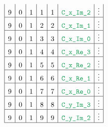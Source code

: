 \begin{figure}[h!]
\begin{adjustwidth}{-2cm}{-2cm}
{\[\begin{array}{|c|c|c|c|c|c|c|}
                    9                      & 0                                       & 1                                         & 1                      & 1                   & \locCXImTwo   & \vdots                                                               \\ \hline
                    9                      & 0                                       & 1                                         & 2                      & 2                   & \locCXImOne   & \vdots                                                               \\ \hline
                    9                      & 0                                       & 1                                         & 3                      & 3                   & \locCXImZero  & \vdots                                                               \\ \hline
                    9                      & 0                                       & 1                                         & 4                      & 4                   & \locCXReThree & \vdots                                                               \\ \hline
                    9                      & 0                                       & 1                                         & 5                      & 5                   & \locCXReTwo   & \vdots                                                               \\ \hline
                    9                      & 0                                       & 1                                         & 6                      & 6                   & \locCXReOne   & \vdots                                                               \\ \hline
                    9                      & 0                                       & 1                                         & 7                      & 7                   & \locCXReZero  & \vdots                                                               \\ \hline
                    9                      & 0                                       & 1                                         & 8                      & 8                   & \locCYImThree & \vdots                                                               \\ \hline
                    9                      & 0                                       & 1                                         & 9                      & 9                   & \locCYImTwo   & \vdots                                                               \\ \hline

\end{array}\]}
\end{adjustwidth}
\end{figure}
